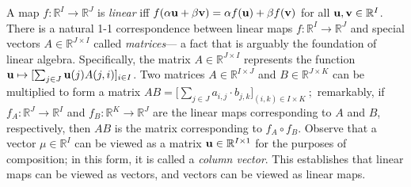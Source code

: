 A map $f : \mathbb R^I \to \mathbb R^J$ is \emph{linear} iff
$f( \alpha \mathbf u + \beta \mathbf v) = \alpha f(\mathbf u) + \beta f(\mathbf v)$ for all $\mathbf u, \mathbf v \in \mathbb R^I$. 
There is a natural
1-1 correspondence between linear maps $f : \mathbb R^I \to \mathbb R^J$ and
special vectors $A \in \mathbb R^{J \times I}$ called \emph{matrices}---%
    a fact that is arguably the foundation of linear algebra.
Specifically, the matrix $A \in \mathbb R^{J\times I}$ represents the function $\mathbf u \mapsto [ \sum_{j \in J} \mathbf u(j) A({j,i}) ]_{i \in I}$.
%
Two matrices $A \in \mathbb R^{I \times J}$ and $B \in \mathbb R^{J \times K}$
can be multiplied to form a matrix
$\displaystyle
    A B = \Big[ \sum_{j \in J} a_{i,j} \cdot b_{j,k} \Big]_{(i,k) \in I \times K}~;
$
remarkably, if $f_A : \mathbb R^{J} \to \mathbb R^{I}$ and $f_B : \mathbb R^{K} \to \mathbb R^J$ are the linear maps corresponding to $A$ and $B$, respectively, then
$A B$ is the matrix corresponding to $f_A \circ f_B$. 
Observe that a vector $\mu \in \mathbb R^I$ can be viewed as
    a matrix $\mathbf u \in \mathbb R^{I \times 1}$ for the purposes of composition; in this form, it is called a \emph{column vector}.
This establishes that linear maps can be viewed as vectors, 
    and vectors can be viewed as linear maps.
%



